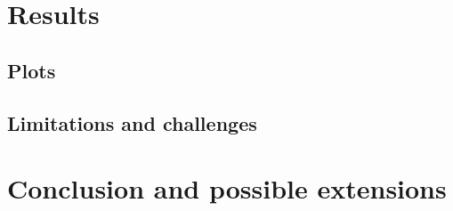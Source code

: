 \documentclass{article}\usepackage[]{graphicx}\usepackage[]{color}
\begin{document}






\section{Results}



\subsection{Plots}



\subsection{Limitations and challenges}




\section{Conclusion and possible extensions}
\end{document}

